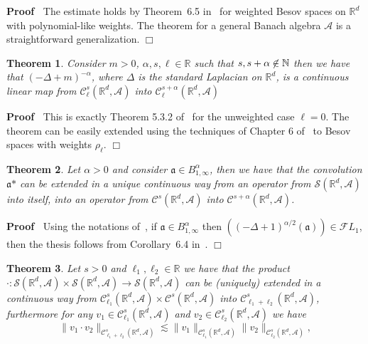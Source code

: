 \documentclass{article}
\newcommand{\asterisk}{\mathord{*}}
\newenvironment{proof}{\noindent\textbf{Proof\ }}{\hspace*{\fill}$\Box$\medskip}
\newtheorem{theorem}{Theorem}
\begin{document}
\begin{proof}
  The estimate holds by Theorem~6.5 in~{\cite{TriebelIII}} for weighted Besov
  spaces on $\mathbb{R}^d$ with polynomial-like weights. The theorem for a
  general Banach algebra $\mathcal{A}$ is a straightforward generalization.
\end{proof}

\begin{theorem}
  \label{theorem_laplacian}Consider $m > 0$, $\alpha, s, \ell \in \mathbb{R}$
  such that $s, s + \alpha \centernot{\in} \mathbb{N}$ then we have that $(- \Delta
  + m)^{- \alpha}$, where $\Delta$ is the standard Laplacian on
  $\mathbb{R}^d$, is a continuous linear map from $\mathcal{C}^s_{\ell}
  (\mathbb{R}^d, \mathcal{A})$ into $\mathcal{C}^{s + \alpha}_{\ell}
  (\mathbb{R}^d, \mathcal{A})$
\end{theorem}

\begin{proof}
  This is exactly Theorem 5.3.2 of~{\cite{Amann2019}} for the unweighted case
  $\ell = 0$. The theorem can be easily extended using the techniques of
  Chapter 6 of~{\cite{TriebelIII}} to Besov spaces with weights $\rho_{\ell}$.
\end{proof}

\begin{theorem}
  \label{theorem_convolution}Let $\alpha > 0$ and consider $\mathfrak{a} \in
  B^{\alpha}_{1, \infty}$, then we have that the convolution $\mathfrak{a}
  \asterisk$ can be extended in a unique continuous way from an operator from
  $\mathcal{S} (\mathbb{R}^d, \mathcal{A})$ into itself, into an operator from
  $\mathcal{C}^s (\mathbb{R}^d, \mathcal{A})$ into $\mathcal{C}^{s + \alpha}
  (\mathbb{R}^d, \mathcal{A})$.
\end{theorem}

\begin{proof}
  Using the notations of~{\cite{Amann1997}}, if $\mathfrak{a \in}
  B^{\alpha}_{1, \infty}$ then $((- \Delta + 1)^{\alpha / 2} (\mathfrak{a}))
  \in \mathcal{F} L_1$, then the thesis follows from Corollary~6.4
  in~{\cite{Amann1997}}.
\end{proof}

\begin{theorem}
  \label{theorem_multiplication}Let $s > 0$ and $\ell_1, \ell_2 \in
  \mathbb{R}$ we have that the product $\cdot : \mathcal{S} (\mathbb{R}^d,
  \mathcal{A}) \times \mathcal{S} (\mathbb{R}^d, \mathcal{A}) \rightarrow
  \mathcal{S} (\mathbb{R}^d, \mathcal{A})$ can be (uniquely) extended in a
  continuous way from $\mathcal{C}^s_{\ell_1} (\mathbb{R}^d, \mathcal{A})
  \times \mathcal{C}^s (\mathbb{R}^d, \mathcal{A})$ into
  $\mathcal{C}^s_{\ell_1 + \ell_2} (\mathbb{R}^d, \mathcal{A})$, furthermore
  for any $v_1 \in \mathcal{C}^s_{\ell_1} (\mathbb{R}^d, \mathcal{A})$ and
  $v_2 \in \mathcal{C}^s_{\ell_2} (\mathbb{R}^d, \mathcal{A})$ we have
  \[ \| v_1 \cdot v_2 \|_{\mathcal{C}^s_{\ell_1 + \ell_2} (\mathbb{R}^d,
     \mathcal{A})} \lesssim \| v_1 \|_{\mathcal{C}^s_{\ell_1} (\mathbb{R}^d,
     \mathcal{A})}  \| v_2 \|_{\mathcal{C}^s_{\ell_2} (\mathbb{R}^d,
     \mathcal{A})}, \]
\end{theorem}
\end{document}

